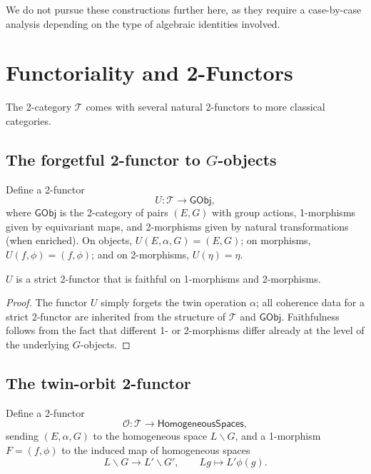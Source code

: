 \documentclass[11pt,a4paper]{article}
\numberwithin{equation}{section}
\newcommand{\TwinSpace}{(E,\alpha,G)}
\newcommand{\Twin}{\mathcal{T}}
\newcommand{\LinearSubgroup}{L}
\begin{document}
	We do not pursue these constructions further here, as they require a case-by-case analysis 
	depending on the type of algebraic identities involved.
	
	\section{Functoriality and 2-Functors}
	\label{sec:functoriality}
	
	The 2-category $\Twin$ comes with several natural 2-functors to more classical categories.
	
	\subsection{The forgetful 2-functor to $G$-objects}
	
	\begin{definition}
		Define a 2-functor
		\[
		U:\Twin \to \mathsf{GObj},
		\]
		where $\mathsf{GObj}$ is the 2-category of pairs $(E,G)$ with group actions, 1-morphisms
		given by equivariant maps, and 2-morphisms given by natural transformations (when enriched).
		On objects, $U(E,\alpha,G)=(E,G)$; on morphisms, $U(f,\phi)=(f,\phi)$; and on 2-morphisms,
		$U(\eta)=\eta$.
	\end{definition}
	
	\begin{proposition}
		$U$ is a strict 2-functor that is faithful on 1-morphisms and 2-morphisms.
	\end{proposition}
	
	\begin{proof}
		The functor $U$ simply forgets the twin operation $\alpha$; all coherence data for a strict
		2-functor are inherited from the structure of $\Twin$ and $\mathsf{GObj}$.
		Faithfulness follows from the fact that different 1- or 2-morphisms differ already at the level
		of the underlying $G$-objects.
	\end{proof}
	
	\subsection{The twin-orbit 2-functor}
	
	\begin{definition}
		Define a 2-functor
		\[
		\mathcal{O} : \Twin \to \mathsf{HomogeneousSpaces},
		\]
		sending $\TwinSpace$ to the homogeneous space $\LinearSubgroup\backslash G$, and a 1-morphism
		$F=(f,\phi)$ to the induced map of homogeneous spaces
		\[
		\LinearSubgroup\backslash G \to \LinearSubgroup'\backslash G',\qquad \LinearSubgroup g \mapsto \LinearSubgroup'\phi(g).
		\]
	\end{definition}
	
\end{document}
